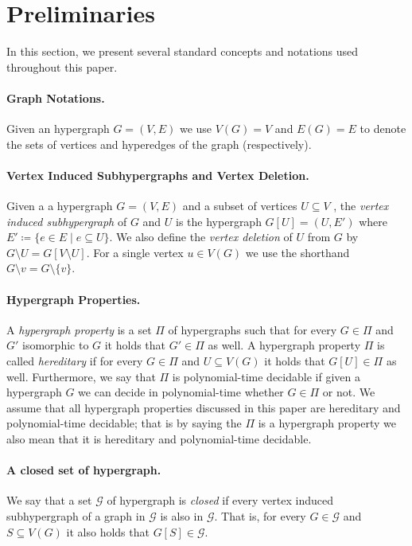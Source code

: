 \documentclass[letterpaper,11pt]{article}
\newcommand{\1}[1]{\mathds{1}\left[#1\right]}
\newcommand{\cG}{\mathcal{G}}
\begin{document}
 
\section{Preliminaries}
\label{sec:definitions}


In this section, we present several standard  concepts and notations used throughout this paper.
 
\paragraph{Graph Notations.} Given an hypergraph $G=(V,E)$ we use $V(G)=V$ and $E(G)=E$ to denote the sets of vertices and hyperedges of the graph (respectively). 

\paragraph{Vertex Induced Subhypergraphs and Vertex Deletion.} Given a a hypergraph $G=(V,E)$ and a subset of vertices $U\subseteq V$ , the {\em vertex induced subhypergraph} of $G$ and $U$ is the hypergraph $G[U] = (U,E')$ where $	E' \coloneqq \{e \in E \mid e \subseteq U\}$.
 We also define the {\em vertex deletion} of $U$ from $G$ by $G\setminus U = G[V\setminus U]$. 
  For a single vertex $u\in V(G)$ we use the shorthand $G\setminus v = G\setminus \{v\}$. 

\paragraph{Hypergraph Properties.} A {\em hypergraph property} is a set $\Pi$ of hypergraphs such that for every $G\in \Pi$ and $G'$ isomorphic to $G$ it holds that $G'\in\Pi$  as well. A hypergraph property $\Pi$ is called {\em hereditary} if for every $G\in \Pi$ and $U\subseteq V(G)$  it holds that $G[U]\in \Pi$ as well.  Furthermore, we say that $\Pi$ is polynomial-time decidable if given a hypergraph $G$ we can decide in polynomial-time whether $G \in \Pi$ or not.
We assume that all hypergraph properties discussed in this paper are hereditary and  polynomial-time decidable; that is by saying the $\Pi$ is a hypergraph property we also mean that it is hereditary and polynomial-time decidable.

\paragraph{A closed set of hypergraph.} We say that a set $\cG$ of hypergraph is {\em closed} if every vertex induced subhypergraph of a graph in $\cG$ is also in $\cG$. That is, for every $G\in \cG$ and $S\subseteq V(G)$ it also holds that $G[S] \in \cG$.
\end{document}
